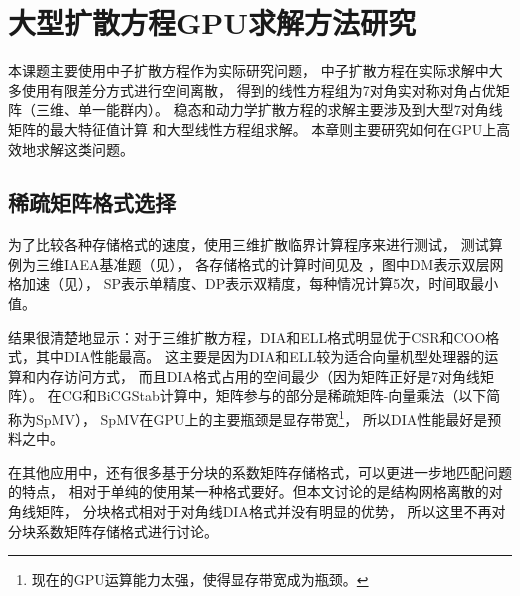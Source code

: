 

\chapter{大型扩散方程GPU求解方法研究}

本课题主要使用中子扩散方程作为实际研究问题，
中子扩散方程在实际求解中大多使用有限差分方式进行空间离散，
得到的线性方程组为7对角实对称对角占优矩阵（三维、单一能群内）。
稳态和动力学扩散方程的求解主要涉及到大型7对角线矩阵的最大特征值计算
和大型线性方程组求解。
本章则主要研究如何在GPU上高效地求解这类问题。

\section{稀疏矩阵格式选择}

为了比较各种存储格式的速度，使用三维扩散临界计算程序来进行测试，
测试算例为三维IAEA基准题（见），
各存储格式的计算时间见及
，图中DM表示双层网格加速（见），
SP表示单精度、DP表示双精度，每种情况计算5次，时间取最小值。

结果很清楚地显示：对于三维扩散方程，DIA和ELL格式明显优于CSR和COO格式，其中DIA性能最高。
这主要是因为DIA和ELL较为适合向量机型处理器的运算和内存访问方式，
而且DIA格式占用的空间最少（因为矩阵正好是7对角线矩阵）。
在CG和BiCGStab计算中，矩阵参与的部分是稀疏矩阵-向量乘法（以下简称为SpMV），
SpMV在GPU上的主要瓶颈是显存带宽\cite{bell2008spmv,baskaran2008optimizing}\footnote{现在的GPU运算能力太强，使得显存带宽成为瓶颈。}，
所以DIA性能最好是预料之中。

在其他应用中，还有很多基于分块的系数矩阵存储格式，可以更进一步地匹配问题的特点，
相对于单纯的使用某一种格式要好。但本文讨论的是结构网格离散的对角线矩阵，
分块格式相对于对角线DIA格式并没有明显的优势，
所以这里不再对分块系数矩阵存储格式进行讨论。

